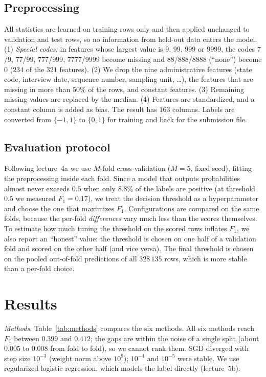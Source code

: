 \documentclass[10pt,conference,compsocconf]{IEEEtran}
\begin{document}
\subsection{Preprocessing}

All statistics are learned on training rows only and then applied
unchanged to validation and test rows, so no information from held-out
data enters the model. (1) \emph{Special codes:} in features whose largest value is $9$, $99$,
$999$ or $9999$, the codes $7$/$9$, $77$/$99$, $777$/$999$, $7777$/$9999$
become missing and $88$/$888$/$8888$ (``none'') become $0$ ($234$ of the
$321$ features). (2) We drop the nine administrative features (state code,
interview date, sequence number, sampling unit, \dots), the features
that are missing in more than $50\%$ of the rows, and constant
features. (3) Remaining missing values are replaced by the median.
(4) Features are standardized, and a constant column is added as bias.
The result has $163$ columns. Labels are converted from $\{-1,1\}$ to
$\{0,1\}$ for training and back for the submission file.

\subsection{Evaluation protocol}

Following lecture~4a we use $M$-fold cross-validation ($M=5$, fixed
seed), fitting the preprocessing inside each fold. Since a model that
outputs probabilities almost never exceeds $0.5$ when only $8.8\%$ of
the labels are positive (at threshold $0.5$ we measured $F_1=0.17$), we
treat the decision threshold as a hyperparameter and choose the one that
maximizes $F_1$. Configurations are compared on the same folds, because
the per-fold \emph{differences} vary much less than the scores
themselves. To estimate how much tuning the threshold on the scored rows
inflates $F_1$, we also report an ``honest'' value: the threshold is
chosen on one half of a validation fold and scored on the other half
(and vice versa). The final threshold is chosen on the pooled
out-of-fold predictions of all $328\,135$ rows, which is more stable than
a per-fold choice.

\section{Results}
\label{sec:results}

\emph{Methods.} Table~\ref{tab:methods} compares the six methods. All
six methods reach $F_1$ between $0.399$ and $0.412$; the gaps are
within the noise of a single split (about $0.005$ to $0.008$ from fold
to fold), so we cannot rank them. SGD diverged with step size $10^{-3}$
(weight norm above $10^{9}$); $10^{-4}$ and $10^{-5}$ were stable. We
use regularized logistic regression, which models the label directly
(lecture~5b).
\end{document}
